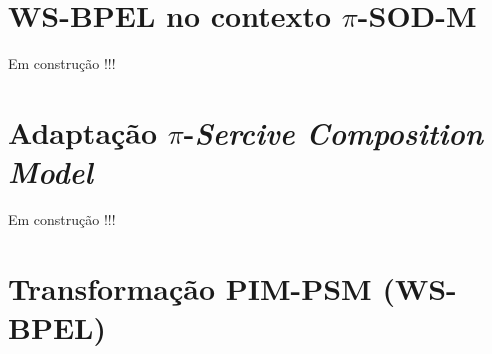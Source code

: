 %
%
%
%
\section{WS-BPEL no contexto $\pi$-SOD-M}%
\label{cdn}


Em construção !!!

\section{Adaptação $\pi$-\textit{Sercive Composition Model}}%
\label{cdn}


Em construção !!!

\section{Transformação PIM-PSM (WS-BPEL)}%
\label{cdn}



